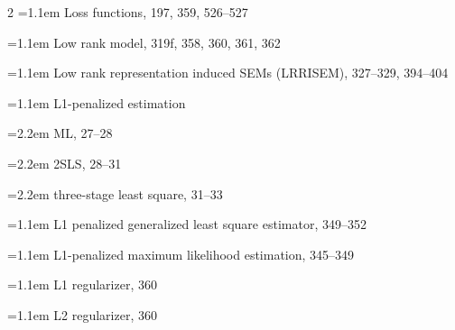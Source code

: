 \begin{multicols}{2}
\noindent\hangindent=1.1em Loss functions, 197, 359, 526--527\par
\noindent\hangindent=1.1em Low rank model, 319f, 358, 360, 361, 362\par
\noindent\hangindent=1.1em Low rank representation induced SEMs (LRRISEM), 327--329, 394--404\par
\noindent\hangindent=1.1em L1-penalized estimation\par
\noindent\hangindent=2.2em \hspace*{1.1em}ML, 27--28\par
\noindent\hangindent=2.2em \hspace*{1.1em}2SLS, 28--31\par
\noindent\hangindent=2.2em \hspace*{1.1em}three-stage least square, 31--33\par
\noindent\hangindent=1.1em L1 penalized generalized least square estimator, 349--352\par
\noindent\hangindent=1.1em L1-penalized maximum likelihood estimation, 345--349\par
\noindent\hangindent=1.1em L1 regularizer, 360\par
\noindent\hangindent=1.1em L2 regularizer, 360\par


\end{multicols}
